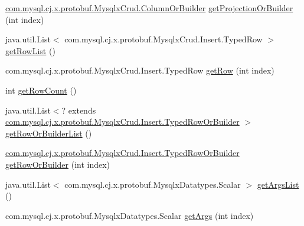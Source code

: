 \begin{DoxyCompactItemize}
\item 
\mbox{\hyperlink{interfacecom_1_1mysql_1_1cj_1_1x_1_1protobuf_1_1_mysqlx_crud_1_1_column_or_builder}{com.\+mysql.\+cj.\+x.\+protobuf.\+Mysqlx\+Crud.\+Column\+Or\+Builder}} \mbox{\hyperlink{interfacecom_1_1mysql_1_1cj_1_1x_1_1protobuf_1_1_mysqlx_crud_1_1_insert_or_builder_ab557b898d521d15672240409ea7833f1}{get\+Projection\+Or\+Builder}} (int index)
\item 
java.\+util.\+List$<$ com.\+mysql.\+cj.\+x.\+protobuf.\+Mysqlx\+Crud.\+Insert.\+Typed\+Row $>$ \mbox{\hyperlink{interfacecom_1_1mysql_1_1cj_1_1x_1_1protobuf_1_1_mysqlx_crud_1_1_insert_or_builder_ad902820d18965febc947ae856e883e40}{get\+Row\+List}} ()
\item 
com.\+mysql.\+cj.\+x.\+protobuf.\+Mysqlx\+Crud.\+Insert.\+Typed\+Row \mbox{\hyperlink{interfacecom_1_1mysql_1_1cj_1_1x_1_1protobuf_1_1_mysqlx_crud_1_1_insert_or_builder_a61b8407b7419cc2a511811a14efc593c}{get\+Row}} (int index)
\item 
int \mbox{\hyperlink{interfacecom_1_1mysql_1_1cj_1_1x_1_1protobuf_1_1_mysqlx_crud_1_1_insert_or_builder_a634ac2a5b59622e94449b9f2f1e409eb}{get\+Row\+Count}} ()
\item 
java.\+util.\+List$<$? extends \mbox{\hyperlink{interfacecom_1_1mysql_1_1cj_1_1x_1_1protobuf_1_1_mysqlx_crud_1_1_insert_1_1_typed_row_or_builder}{com.\+mysql.\+cj.\+x.\+protobuf.\+Mysqlx\+Crud.\+Insert.\+Typed\+Row\+Or\+Builder}} $>$ \mbox{\hyperlink{interfacecom_1_1mysql_1_1cj_1_1x_1_1protobuf_1_1_mysqlx_crud_1_1_insert_or_builder_a38f7236838d1a6a599e9a7fccf4b7dac}{get\+Row\+Or\+Builder\+List}} ()
\item 
\mbox{\hyperlink{interfacecom_1_1mysql_1_1cj_1_1x_1_1protobuf_1_1_mysqlx_crud_1_1_insert_1_1_typed_row_or_builder}{com.\+mysql.\+cj.\+x.\+protobuf.\+Mysqlx\+Crud.\+Insert.\+Typed\+Row\+Or\+Builder}} \mbox{\hyperlink{interfacecom_1_1mysql_1_1cj_1_1x_1_1protobuf_1_1_mysqlx_crud_1_1_insert_or_builder_aef4dfb7d7a2f526cddc4e7287e0e6275}{get\+Row\+Or\+Builder}} (int index)
\item 
java.\+util.\+List$<$ com.\+mysql.\+cj.\+x.\+protobuf.\+Mysqlx\+Datatypes.\+Scalar $>$ \mbox{\hyperlink{interfacecom_1_1mysql_1_1cj_1_1x_1_1protobuf_1_1_mysqlx_crud_1_1_insert_or_builder_a56f17cf226b33fd7e6fbe3a83218534b}{get\+Args\+List}} ()
\item 
com.\+mysql.\+cj.\+x.\+protobuf.\+Mysqlx\+Datatypes.\+Scalar \mbox{\hyperlink{interfacecom_1_1mysql_1_1cj_1_1x_1_1protobuf_1_1_mysqlx_crud_1_1_insert_or_builder_a6c4922d9ab361ae3de5486858c55e5fb}{get\+Args}} (int index)
\item 

\end{DoxyCompactItemize}
